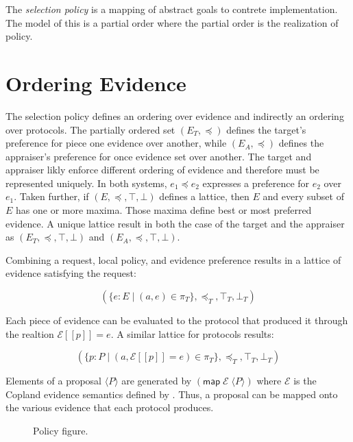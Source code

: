 \documentclass[sigconf,authordraft]{acmart}
\begin{document}
The \emph{selection policy} is a mapping of abstract goals to contrete implementation. The model of this is a partial order where the partial order is the realization of policy. 

\section{Ordering Evidence}

The selection policy defines an ordering over evidence and
indirectly an ordering over protocols. The partially ordered set
$(E_T,\preceq)$ defines the target's preference for piece one evidence
over another, while $(E_A,\preceq)$ defines the appraiser's preference for once evidence set over another. The target and appraiser likly enforce different ordering of evidence and therefore must be represented uniquely. In both systems, $e_1\preceq e_2$ expresses a preference for $e_2$ over
$e_1$.  Taken further, if $(E,\preceq,\top,\bot)$ defines a lattice,
then $E$ and every subset of $E$ has one or more maxima.  Those maxima
define best or most preferred evidence. A unique lattice result in both the case of the target and the appraiser as $(E_T,\preceq,\top,\bot)$ and $(E_A,\preceq,\top,\bot)$.

Combining a request, local policy, and evidence preference results in
a lattice of evidence satisfying the request:

\[(\{e:E\mid (a,e)\in\pi_T\},\preceq_T,\top_T,\bot_T)\]

Each piece of evidence can be evaluated to the protocol that produced it through the realtion $\mathcal{E}[\![p]\!]=e$. A similar lattice for protocols results:

\[(\{p:P\mid
  (a,\mathcal{E}[\![p]\!]=e)\in\pi_T\},\preceq_T,\top_T,\bot_T)\]


Elements of a proposal $\langle P\rangle$ are generated by
$(\mathsf{map}\; \mathcal{E}\; \langle P\rangle)$ where $\mathcal{E}$
is the Copland evidence semantics defined by \citet{Ramsdell:2019aa}.
Thus, a proposal can be mapped onto the various evidence that each
protocol produces.

\begin{figure}[hbtp]
  \centering 
  \caption[Attestation process]{Policy figure.}
  \label{fig:policy-fig-embed}
\end{figure}
\end{document}
